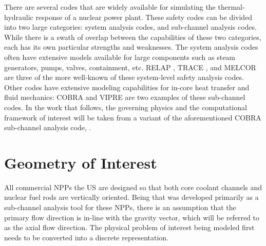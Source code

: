 There are several codes that are widely available for simulating the thermal-hydraulic response of a nuclear power plant.
These safety codes can be divided into two large categories: system analysis codes, and sub-channel analysis codes.
While there is a swath of overlap between the capabilities of these two categories, each has its own particular strengths and weaknesses.
The system analysis codes often have extensive models available for large components such as steam generators, pumps, valves, containment, etc.
RELAP \cite{RELAP}, TRACE \cite{TRACE}, and MELCOR \cite{Summers1994} are three of the more well-known of these system-level safety analysis codes.
Other codes have extensive modeling capabilities for in-core heat transfer and fluid mechanics: COBRA \cite{Thurgood1983c} and VIPRE are two examples of these sub-channel codes.
In the work that follows, the governing physics and the computational framework of interest will be taken from a variant of the aforementioned COBRA sub-channel analysis code, \cobra{}.
\section{Geometry of Interest}
\label{sect:topology}
All commercial NPPs the US are designed so that both core coolant channels and nuclear fuel rods are vertically oriented.
Being that \cobra{} was developed primarily as a sub-channel analysis tool for these NPPs, there is an assumption that the primary flow direction is in-line with the gravity vector, which will be referred to as the axial flow direction.
The physical problem of interest being modeled first needs to be converted into a discrete representation. 

